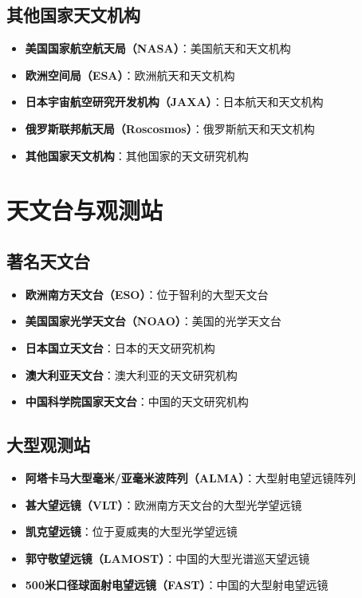 \documentclass[12pt,UTF8]{ctexbook}
\begin{document}
\section{其他国家天文机构}

\begin{itemize}
  \item \textbf{美国国家航空航天局（NASA）}：美国航天和天文机构
  \item \textbf{欧洲空间局（ESA）}：欧洲航天和天文机构
  \item \textbf{日本宇宙航空研究开发机构（JAXA）}：日本航天和天文机构
  \item \textbf{俄罗斯联邦航天局（Roscosmos）}：俄罗斯航天和天文机构
  \item \textbf{其他国家天文机构}：其他国家的天文研究机构
\end{itemize}

\chapter{天文台与观测站}
\section{著名天文台}

\begin{itemize}
  \item \textbf{欧洲南方天文台（ESO）}：位于智利的大型天文台
  \item \textbf{美国国家光学天文台（NOAO）}：美国的光学天文台
  \item \textbf{日本国立天文台}：日本的天文研究机构
  \item \textbf{澳大利亚天文台}：澳大利亚的天文研究机构
  \item \textbf{中国科学院国家天文台}：中国的天文研究机构
\end{itemize}

\section{大型观测站}

\begin{itemize}
  \item \textbf{阿塔卡马大型毫米/亚毫米波阵列（ALMA）}：大型射电望远镜阵列
  \item \textbf{甚大望远镜（VLT）}：欧洲南方天文台的大型光学望远镜
  \item \textbf{凯克望远镜}：位于夏威夷的大型光学望远镜
  \item \textbf{郭守敬望远镜（LAMOST）}：中国的大型光谱巡天望远镜
  \item \textbf{500米口径球面射电望远镜（FAST）}：中国的大型射电望远镜
\end{itemize}
\end{document}

